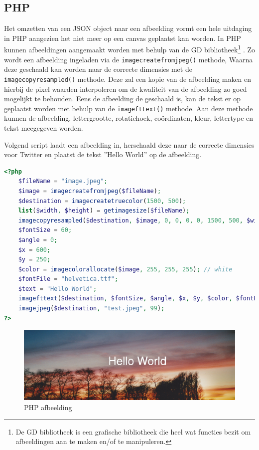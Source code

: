 \subsection{PHP}
Het omzetten van een JSON object naar een afbeelding vormt een hele uitdaging in PHP aangezien het niet meer op een canvas geplaatst kan worden. In PHP kunnen afbeeldingen aangemaakt worden met behulp van de GD bibliotheek\footnote{De GD bibliotheek is een grafische bibliotheek die heel wat functies bezit om afbeeldingen aan te maken en/of te manipuleren.} \cite{GDlibrary}. Zo wordt een afbeelding ingeladen via de \texttt{imagecreatefromjpeg()} methode, Waarna deze geschaald kan worden naar de correcte dimensies met de \texttt{imagecopyresampled()} methode. Deze zal een kopie van de afbeelding maken en hierbij de pixel waarden interpoleren om de kwaliteit van de afbeelding zo goed mogelijkt te behouden. Eens de afbeelding de geschaald is, kan de tekst er op geplaatst worden met behulp van de \texttt{imagefttext()} methode. Aan deze methode kunnen de afbeelding, lettergrootte, rotatiehoek, co\"{o}rdinaten, kleur, lettertype en tekst meegegeven worden. 

Volgend script laadt een afbeelding in, herschaald deze naar de correcte dimensies voor Twitter en plaatst de tekst ''Hello World'' op de afbeelding.
\begin{lstlisting}[language=PHP]
<?php
	$fileName = "image.jpeg";
	$image = imagecreatefromjpeg($fileName);
	$destination = imagecreatetruecolor(1500, 500);
	list($width, $height) = getimagesize($fileName);
	imagecopyresampled($destination, $image, 0, 0, 0, 0, 1500, 500, $width, $height);
	$fontSize = 60;
	$angle = 0;
	$x = 600;
	$y = 250;
	$color = imagecolorallocate($image, 255, 255, 255); // white
	$fontFile = "helvetica.ttf";
	$text = "Hello World";
	imagefttext($destination, $fontSize, $angle, $x, $y, $color, $fontFile, $text);
	imagejpeg($destination, "test.jpeg", 99);
?>
\end{lstlisting}

\begin{figure}[H]
	\centering
	\includegraphics[width=1\textwidth]{Figuren/PHP_rendering.jpeg}
	\caption{PHP afbeelding \cite{}}
	\label{fig:PHP}
\end{figure} 
%

